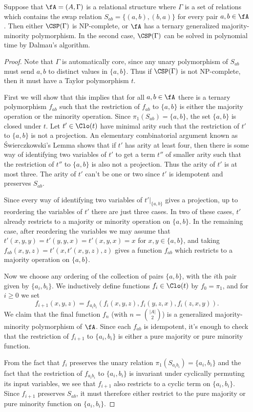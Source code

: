 \begin{thm}\label{thm-swap-gmm} Suppose that $\fA = (A,\Gamma)$ is a relational structure where $\Gamma$ is a set of relations which contains the swap relation $S_{ab} = \{(a,b),(b,a)\}$ for every pair $a,b \in \fA$. Then either $\CSP(\Gamma)$ is NP-complete, or $\fA$ has a ternary generalized majority-minority polymorphism. In the second case, $\CSP(\Gamma)$ can be solved in polynomial time by Dalmau's algorithm.
\end{thm}
\begin{proof} Note that $\Gamma$ is automatically core, since any unary polymorphism of $S_{ab}$ must send $a,b$ to distinct values in $\{a,b\}$. Thus if $\CSP(\Gamma)$ is not NP-complete, then it must have a Taylor polymorphism $t$.

First we will show that this implies that for all $a,b \in \fA$ there is a ternary polymorphism $f_{ab}$ such that the restriction of $f_{ab}$ to $\{a,b\}$ is either the majority operation or the minority operation. Since $\pi_1(S_{ab}) = \{a,b\}$, the set $\{a,b\}$ is closed under $t$. Let $t' \in \Clo(t)$ have minimal arity such that the restriction of $t'$ to $\{a,b\}$ is not a projection. An elementary combinatorial argument known as {\'S}wierczkowski's Lemma \cite{semiprojection-lemma} shows that if $t'$ has arity at least four, then there is some way of identifying two variables of $t'$ to get a term $t''$ of smaller arity such that the restriction of $t''$ to $\{a,b\}$ is also not a projection. Thus the arity of $t'$ is at most three. The arity of $t'$ can't be one or two since $t'$ is idempotent and preserves $S_{ab}$.

Since every way of identifying two variables of $t'|_{\{a,b\}}$ gives a projection, up to reordering the variables of $t'$ there are just three cases. In two of these cases, $t'$ already restricts to a majority or minority operation on $\{a,b\}$. In the remaining case, after reordering the variables we may assume that $t'(x,y,y) = t'(y,y,x) = t'(x,y,x) = x$ for $x,y \in \{a,b\}$, and taking $f_{ab}(x,y,z) = t'(x,t'(x,y,z),z)$ gives a function $f_{ab}$ which restricts to a majority operation on $\{a,b\}$.

Now we choose any ordering of the collection of pairs $\{a,b\}$, with the $i$th pair given by $\{a_i,b_i\}$. We inductively define functions $f_i \in \Clo(t)$ by $f_0 = \pi_1$, and for $i \ge 0$ we set
\[
f_{i+1}(x,y,z) = f_{a_ib_i}(f_i(x,y,z),f_i(y,z,x),f_i(z,x,y)).
\]
We claim that the final function $f_n$ (with $n = \binom{|A|}{2}$) is a generalized majority-minority polymorphism of $\fA$. Since each $f_{ab}$ is idempotent, it's enough to check that the restriction of $f_{i+1}$ to $\{a_i,b_i\}$ is either a pure majority or pure minority function.

From the fact that $f_i$ preserves the unary relation $\pi_1(S_{a_ib_i}) = \{a_i,b_i\}$ and the fact that the restriction of $f_{a_ib_i}$ to $\{a_i,b_i\}$ is invariant under cyclically permuting its input variables, we see that $f_{i+1}$ also restricts to a cyclic term on $\{a_i,b_i\}$. Since $f_{i+1}$ preserves $S_{ab}$, it must therefore either restrict to the pure majority or pure minority function on $\{a_i,b_i\}$.
\end{proof}

